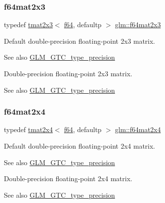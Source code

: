 \subsubsection{\texorpdfstring{f64mat2x3}{f64mat2x3}}
{\footnotesize\ttfamily typedef \hyperlink{structglm_1_1tmat2x3}{tmat2x3}$<$ \hyperlink{group__gtc__type__precision_ga2bba392e555124b36cde6abba349bab3}{f64}, defaultp $>$ \hyperlink{group__gtc__type__precision_ga6d0196bded514d55e26e0f68dd38b37b}{glm\+::f64mat2x3}}

Default double-\/precision floating-\/point 2x3 matrix. \begin{DoxySeeAlso}{See also}
\hyperlink{group__gtc__type__precision}{G\+L\+M\+\_\+\+G\+T\+C\+\_\+type\+\_\+precision}
\end{DoxySeeAlso}
Double-\/precision floating-\/point 2x3 matrix. \begin{DoxySeeAlso}{See also}
\hyperlink{group__gtc__type__precision}{G\+L\+M\+\_\+\+G\+T\+C\+\_\+type\+\_\+precision} 
\end{DoxySeeAlso}
\mbox{\label{group__gtc__type__precision_gaf18b9f693f2ef743d93c9afd5cfbe229}} 
\subsubsection{\texorpdfstring{f64mat2x4}{f64mat2x4}}
{\footnotesize\ttfamily typedef \hyperlink{structglm_1_1tmat2x4}{tmat2x4}$<$ \hyperlink{group__gtc__type__precision_ga2bba392e555124b36cde6abba349bab3}{f64}, defaultp $>$ \hyperlink{group__gtc__type__precision_gaf18b9f693f2ef743d93c9afd5cfbe229}{glm\+::f64mat2x4}}

Default double-\/precision floating-\/point 2x4 matrix. \begin{DoxySeeAlso}{See also}
\hyperlink{group__gtc__type__precision}{G\+L\+M\+\_\+\+G\+T\+C\+\_\+type\+\_\+precision}
\end{DoxySeeAlso}
Double-\/precision floating-\/point 2x4 matrix. \begin{DoxySeeAlso}{See also}
\hyperlink{group__gtc__type__precision}{G\+L\+M\+\_\+\+G\+T\+C\+\_\+type\+\_\+precision} 
\end{DoxySeeAlso}
\mbox{\label{group__gtc__type__precision_ga44f23eb3c2e893d0afb1aa2b9e89be76}} 
